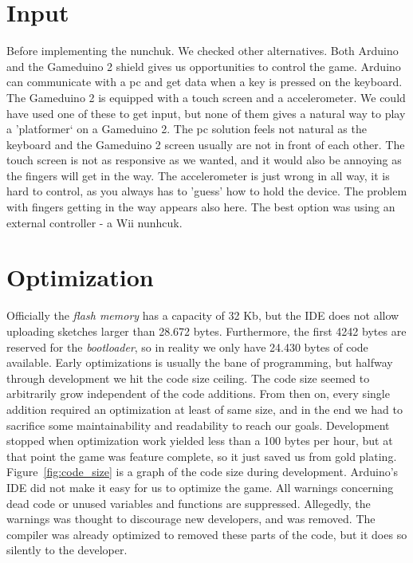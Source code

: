 \section{Input}
Before implementing the nunchuk. We checked other alternatives. Both Arduino and the Gameduino 2 shield gives us opportunities to control the game. Arduino can communicate with a pc and get data when a key is pressed on the keyboard. The Gameduino 2 is equipped with a touch screen and a accelerometer. We could have used one of these to get input, but none of them gives a natural way to play a 'platformer` on a Gameduino 2. The pc solution feels not natural as the keyboard and the Gameduino 2 screen usually are not in front of each other. The touch screen is not as responsive as we wanted, and it would also be annoying as the fingers will get in the way. The accelerometer is just wrong in all way, it is hard to control, as you always has to 'guess' how to hold the device. The problem with fingers getting in the way appears also here. The best option was using an external controller - a Wii nunhcuk.



\section{Optimization} %
Officially the \emph{flash memory} has a capacity of 32 Kb, but the IDE does not allow uploading sketches larger than 28.672 bytes. Furthermore, the first 4242 bytes are reserved for the \emph{bootloader}, so in reality we only have 24.430 bytes of code available. %
\newline
Early optimizations is usually the bane of programming, but halfway through development we hit the code size ceiling. The code size seemed to arbitrarily grow independent of the code additions. From then on, every single addition required an optimization at least of same size, and in the end we had to sacrifice some maintainability and readability to reach our goals. Development stopped when optimization work yielded less than a 100 bytes per hour, but at that point the game was feature complete, so it just saved us from gold plating. Figure~\ref{fig:code_size} is a graph of the code size during development.
\newline
Arduino's IDE did not make it easy for us to optimize the game. All warnings concerning dead code or unused variables and functions are suppressed. Allegedly, the warnings was thought to discourage new developers, and was removed. The compiler was already optimized to removed these parts of the code, but it does so silently to the developer.

